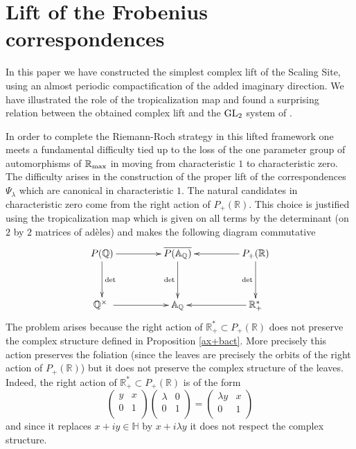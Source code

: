 \documentclass[graybox, envcountsect%
]{svmult}
\def\GL{{\rm GL}}
\def\A{{\mathbb A}}
\def\Q{{\mathbb Q}}
\def\R{{\mathbb R}}
\def\H{{\mathbb H}}
\def\rma{\R_{\rm max}}
\begin{document}
\section{Lift of the Frobenius correspondences}\label{sect:7}


In this paper we have constructed the simplest complex lift of the Scaling Site, using an almost periodic compactification of the added imaginary direction. We have illustrated the role of the tropicalization map and found a surprising relation between the obtained complex lift and the $\GL_2$ system of \cite{cmbook}. 


 
In order to complete the Riemann-Roch strategy in this lifted framework one meets a fundamental difficulty tied up to the loss of the one parameter group of automorphisms of $\rma$ in moving from characteristic $1$ to characteristic zero. The difficulty arises in the  construction of the proper lift of the correspondences  $\Psi_\lambda$ which are canonical in characteristic $1$. The natural candidates in characteristic zero come from the right action of $P_+(\R)$. This choice is justified using the tropicalization map which is given on all terms by the determinant (on $2$ by $2$ matrices of ad\`eles) and makes the following diagram commutative 
\begin{equation}\label{tropdet}
\xymatrix@C=20pt@R=35pt{
  P(\Q)\ar[d]^{\det}\ar[rr]^{} && \overline{P(\A_\Q)}\ar[d]_{\det} && P_+(\R)\ar[d]_{\det}\ar[ll]^{}
\\
\Q^\times \ \ar[rr]^{}&& \A_\Q &&  \R^*_+ \ar[ll]^{}}
\end{equation}
The problem arises because the right action of  $\R^*_+\subset P_+(\R)$ does not preserve the complex structure defined in 
 Proposition \ref{ax+bact}. More precisely this action preserves the foliation (since the leaves are precisely the orbits of the right action of $P_+(\R)$)  but it does not preserve  the complex structure of the leaves. Indeed, the right action of  $\R^*_+\subset P_+(\R)$ is of the form 
$$
\left(
\begin{array}{cc}
 y & x \\
 0 & 1 \\
\end{array}
\right)\left(
\begin{array}{cc}
 \lambda & 0 \\
 0 & 1 \\
\end{array}
\right)=
\left(
\begin{array}{cc}
  \lambda y & x\\
 0 & 1 \\
\end{array}
\right)
$$
and since it replaces $x+iy\in \H$ by $x+i \lambda y$  it does not respect the complex structure.	
\end{document}
